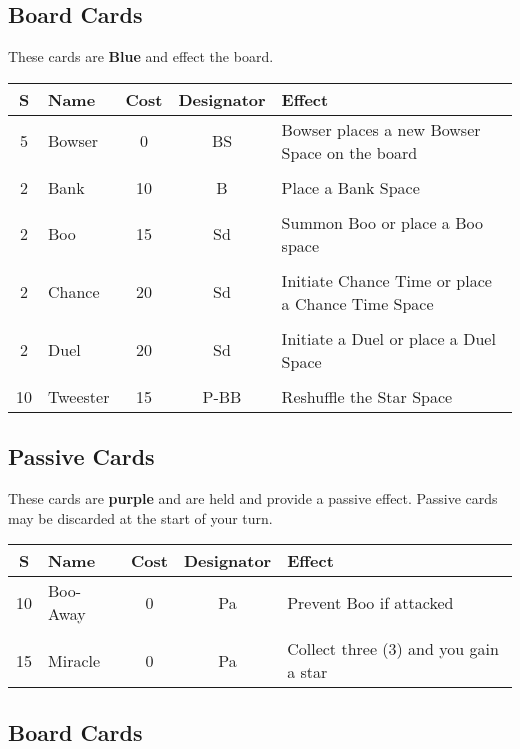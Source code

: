 \documentclass{article}
\begin{document}
\subsection{Board Cards}

These cards are \textbf{Blue} and effect the board.
\vspace*{2ex}

\begin{tabular}{clccl}
\textbf{S} & \textbf{Name} & \textbf{Cost} & \textbf{Designator} & \textbf{Effect} \\
\hline
5 & Bowser & 0 & BS & Bowser places a new Bowser Space on the board \\
&&&& \\
2 & Bank & 10 & B & Place a Bank Space \\
&&&& \\
2 & Boo & 15 & Sd & Summon Boo or place a Boo space \\
&&&& \\
2 & Chance & 20 & Sd & Initiate Chance Time or place a Chance Time Space \\
&&&& \\
2 & Duel & 20 & Sd & Initiate a Duel or place a Duel Space \\
&&&& \\
10 & Tweester & 15 & P-BB & Reshuffle the Star Space \\
\end{tabular}

\subsection{Passive Cards}

These cards are \textbf{purple} and are held and provide a passive effect.
Passive cards may be discarded at the start of your turn.
\vspace*{2ex}

\begin{tabular}{clccl}
\textbf{S} & \textbf{Name} & \textbf{Cost} & \textbf{Designator} & \textbf{Effect} \\
\hline
10 & Boo-Away & 0 & Pa & Prevent Boo if attacked \\ %
&&&& \\
15 & Miracle & 0 & Pa & Collect three (3) and you gain a star \\
\end{tabular}

\subsection{Board Cards}
\end{document}
